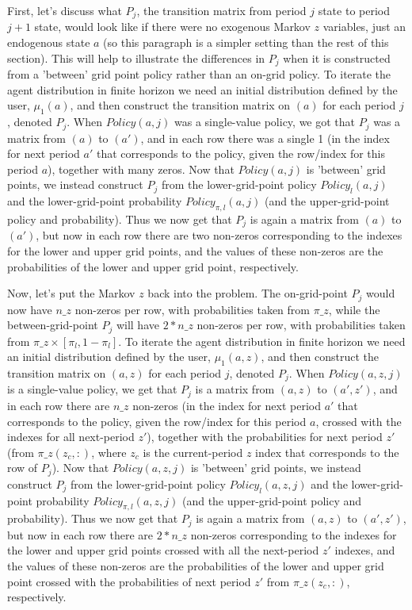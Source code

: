 First, let's discuss what $P_j$, the transition matrix from period $j$ state to period $j+1$ state, would look like if there were no exogenous Markov $z$ variables, just an endogenous state $a$ (so this paragraph is a simpler setting than the rest of this section). This will help to illustrate the differences in $P_j$ when it is constructed from a 'between' grid point policy rather than an on-grid policy. To iterate the agent distribution in finite horizon we need an initial distribution defined by the user, $\mu_1(a)$, and then construct the transition matrix on $(a)$ for each period $j$, denoted $P_j$. When $Policy(a,j)$ was a single-value policy, we got that $P_j$ was a matrix from $(a)$ to $(a')$, and in each row there was a single 1 (in the index for next period $a'$ that corresponds to the policy, given the row/index for this period $a$), together with many zeros. Now that $Policy(a,j)$ is 'between' grid points, we instead construct $P_j$ from the lower-grid-point policy $Policy_l(a,j)$ and the lower-grid-point probability $Policy_{\pi,l}(a,j)$ (and the upper-grid-point policy and probability). Thus we now get that $P_j$ is again a matrix from $(a)$ to $(a')$, but now in each row there are two non-zeros corresponding to the indexes for the lower and upper grid points, and the values of these non-zeros are the probabilities of the lower and upper grid point, respectively.

Now, let's put the Markov $z$ back into the problem. The on-grid-point $P_j$ would now have $n\_{}z$ non-zeros per row, with probabilities taken from $\pi\_{}z$, while the between-grid-point $P_j$ will have $2*n\_{}z$ non-zeros per row, with probabilities taken from $\pi\_{}z \times [\pi_{l},1-\pi_{l}]$. To iterate the agent distribution in finite horizon we need an initial distribution defined by the user, $\mu_1(a,z)$, and then construct the transition matrix on $(a,z)$ for each period $j$, denoted $P_j$. When $Policy(a,z,j)$ is a single-value policy, we get that $P_j$ is a matrix from $(a,z)$ to $(a',z')$, and in each row there are $n\_{}z$ non-zeros (in the index for next period $a'$ that corresponds to the policy, given the row/index for this period $a$, crossed with the indexes for all next-period $z'$), together with the probabilities for next period $z'$ (from $\pi\_{}z(z_c,:)$, where $z_c$ is the current-period $z$ index that corresponds to the row of $P_j$). Now that $Policy(a,z,j)$ is 'between' grid points, we instead construct $P_j$ from the lower-grid-point policy $Policy_l(a,z,j)$ and the lower-grid-point probability $Policy_{\pi,l}(a,z,j)$ (and the upper-grid-point policy and probability). Thus we now get that $P_j$ is again a matrix from $(a,z)$ to $(a',z')$, but now in each row there are $2*n\_{}z$ non-zeros corresponding to the indexes for the lower and upper grid points crossed with all the next-period $z'$ indexes, and the values of these non-zeros are the probabilities of the lower and upper grid point crossed with the probabilities of next period $z'$ from $\pi\_{}z(z_c,:)$, respectively.

